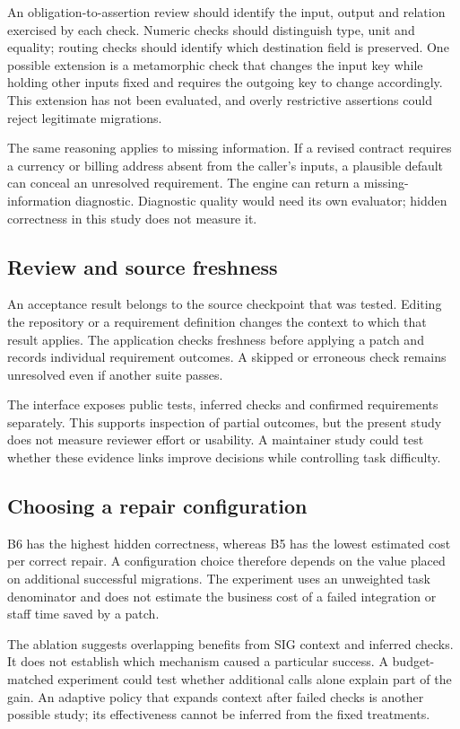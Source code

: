 An obligation-to-assertion review should identify the input, output and relation exercised by each check. Numeric checks should distinguish type, unit and equality; routing checks should identify which destination field is preserved. One possible extension is a metamorphic check that changes the input key while holding other inputs fixed and requires the outgoing key to change accordingly. This extension has not been evaluated, and overly restrictive assertions could reject legitimate migrations.

The same reasoning applies to missing information. If a revised contract requires a currency or billing address absent from the caller's inputs, a plausible default can conceal an unresolved requirement. The engine can return a missing-information diagnostic. Diagnostic quality would need its own evaluator; hidden correctness in this study does not measure it.

\subsection{Review and source freshness}
An acceptance result belongs to the source checkpoint that was tested. Editing the repository or a requirement definition changes the context to which that result applies. The application checks freshness before applying a patch and records individual requirement outcomes. A skipped or erroneous check remains unresolved even if another suite passes.

The interface exposes public tests, inferred checks and confirmed requirements separately. This supports inspection of partial outcomes, but the present study does not measure reviewer effort or usability. A maintainer study could test whether these evidence links improve decisions while controlling task difficulty.
\fi

\subsection{Choosing a repair configuration}
B6 has the highest hidden correctness, whereas B5 has the lowest estimated cost per correct repair. A configuration choice therefore depends on the value placed on additional successful migrations. The experiment uses an unweighted task denominator and does not estimate the business cost of a failed integration or staff time saved by a patch.

The ablation suggests overlapping benefits from SIG context and inferred checks. It does not establish which mechanism caused a particular success. A budget-matched experiment could test whether additional calls alone explain part of the gain. An adaptive policy that expands context after failed checks is another possible study; its effectiveness cannot be inferred from the fixed treatments.

